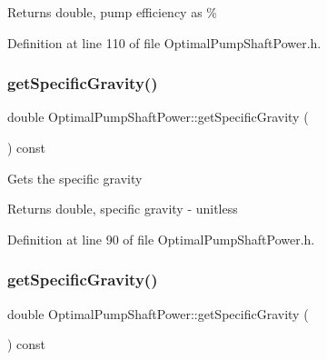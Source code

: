 \begin{DoxyReturn}{Returns}
double, pump efficiency as \% 
\end{DoxyReturn}


Definition at line 110 of file Optimal\+Pump\+Shaft\+Power.\+h.

\mbox{\label{class_optimal_pump_shaft_power_a607d32c56edece639e03007adc1bf325}} 
\subsubsection{\texorpdfstring{get\+Specific\+Gravity()}{getSpecificGravity()}\hspace{0.1cm}{\footnotesize\ttfamily [1/3]}}
{\footnotesize\ttfamily double Optimal\+Pump\+Shaft\+Power\+::get\+Specific\+Gravity (\begin{DoxyParamCaption}{ }\end{DoxyParamCaption}) const\hspace{0.3cm}{\ttfamily [inline]}}

Gets the specific gravity

\begin{DoxyReturn}{Returns}
double, specific gravity -\/ unitless 
\end{DoxyReturn}


Definition at line 90 of file Optimal\+Pump\+Shaft\+Power.\+h.

\mbox{\label{class_optimal_pump_shaft_power_a607d32c56edece639e03007adc1bf325}} 
\subsubsection{\texorpdfstring{get\+Specific\+Gravity()}{getSpecificGravity()}\hspace{0.1cm}{\footnotesize\ttfamily [2/3]}}
{\footnotesize\ttfamily double Optimal\+Pump\+Shaft\+Power\+::get\+Specific\+Gravity (\begin{DoxyParamCaption}{ }\end{DoxyParamCaption}) const\hspace{0.3cm}{\ttfamily [inline]}}

